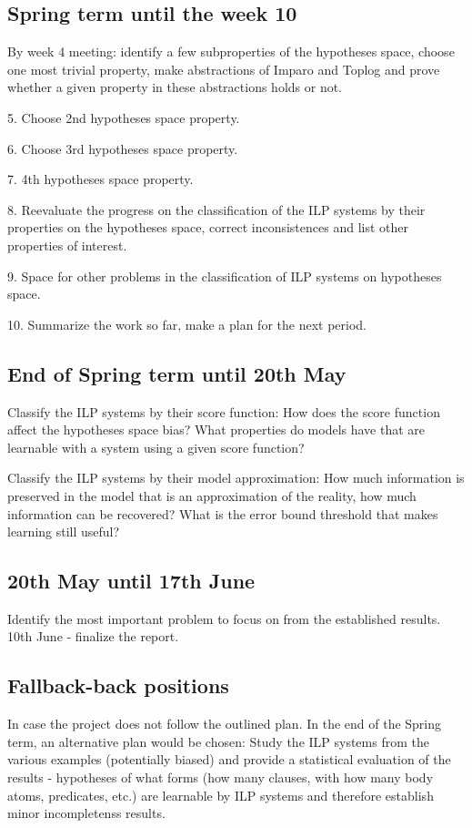 \subsection{Spring term until the  week 10}
By week 4 meeting: identify a few subproperties of the hypotheses space,
choose one most trivial property, make abstractions of Imparo and Toplog and prove whether a given property in these abstractions holds or not.

5. Choose 2nd hypotheses space property.

6. Choose 3rd hypotheses space property.

7. 4th hypotheses space property.

8. Reevaluate the progress on the classification of the ILP systems by their properties on the hypotheses space, correct inconsistences and list other properties of interest.

9. Space for other problems in the classification of ILP systems on hypotheses space.

10. Summarize the work so far, make a plan for the next period.

\subsection{End of Spring term until 20th May}
Classify the ILP systems by their score function:
How does the score function affect the hypotheses space bias?
What properties do models have that are learnable with a system using a given score function?

Classify the ILP systems by their model approximation:
How much information is preserved in the model that is an approximation of the reality, how much information can be recovered?
What is the error bound threshold that makes learning still useful?

\subsection{20th May until 17th June}
Identify the most important problem to focus on from the established results.
10th June - finalize the report.

\subsection{Fallback-back positions}
In case the project does not follow the outlined plan. In the end of the Spring term, an alternative plan would be chosen:
Study the ILP systems from the various examples (potentially biased) and provide a statistical evaluation of the results - hypotheses of what forms (how many clauses, with how many body atoms, predicates, etc.) are learnable by ILP systems and therefore establish minor incompletenss results.

